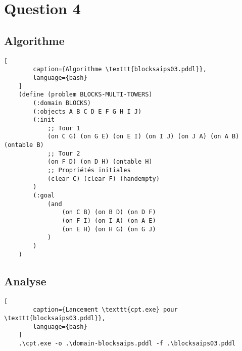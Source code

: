 \documentclass[../CSC_5RO16_TA_TP5.tex]{subfiles}
\begin{document}
\section{Question 4}
% 

\subsection{Algorithme}

\begin{scriptsize}\mycode
    \begin{lstlisting}[
        caption={Algorithme \texttt{blocksaips03.pddl}},
        language={bash}
    ]
    (define (problem BLOCKS-MULTI-TOWERS)
        (:domain BLOCKS)
        (:objects A B C D E F G H I J)
        (:init 
            ;; Tour 1
            (on C G) (on G E) (on E I) (on I J) (on J A) (on A B) (ontable B)
            ;; Tour 2
            (on F D) (on D H) (ontable H)
            ;; Propriétés initiales
            (clear C) (clear F) (handempty)
        )
        (:goal 
            (and 
                (on C B) (on B D) (on D F)
                (on F I) (on I A) (on A E)
                (on E H) (on H G) (on G J)
            )
        )
    )
    \end{lstlisting}
\end{scriptsize}

\subsection{Analyse}

\begin{scriptsize}\mycode
	\begin{lstlisting}[
        caption={Lancement \texttt{cpt.exe} pour \texttt{blocksaips03.pddl}},
        language={bash}
    ]
    .\cpt.exe -o .\domain-blocksaips.pddl -f .\blocksaips03.pddl
    \end{lstlisting}
\end{scriptsize}
\end{document}
